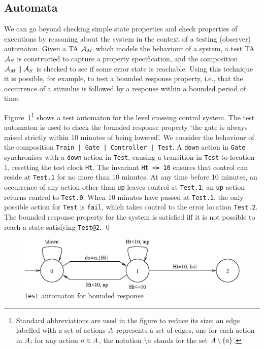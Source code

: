 {\subsection{Automata\label{ss:mscautomata}}
We can go beyond checking simple state properties and check properties
of executions by reasoning about the system in the context of a
testing (observer) automaton. Given a TA $\AA_M$ which models the
behaviour of a system, a test TA $\AA_S$ is constructed to capture a
property specification, and the composition $\AA_M
\parallel \AA_S$ is checked to see if some error state is 
reachable. Using this technique it is possible, for example, to test a
bounded response property, i.e., that the occurrence of a stimulus is
followed by a response within a bounded period of time.

\begin{exampleb}
Figure~\ref{fig:tgcresponse}\footnote{Standard abbreviations are used
in the figure to reduce its size: an edge labelled with a set of
actions $A$ represents a set of edges, one for each action in 
$A$; for any action $a \in A$, the notation ${}\setminus{a}$ 
stands for the set $A \setminus \{a\}$.} shows a test automaton for the
level crossing control system. The test automaton is used to check the
bounded response property `the gate is always raised strictly within
10 minutes of being lowered'. We consider the behaviour of the
composition {\tt Train | Gate | Controller | Test}. A {\tt down} action
in {\tt Gate} synchronises with a {\tt down} action in {\tt Test},
causing a transition in {\tt Test} to location 1, resetting the test
clock {\tt Ht}. The invariant {\tt Ht <= 10} ensures that control can
reside at {\tt Test.1} for no more than 10 minutes.  At any time
before 10 minutes, an occurrence of any action other than {\tt up}
leaves control at {\tt Test.1}; an {\tt up} action returns control to
{\tt Test.0}.  When 10 minutes have passed at {\tt Test.1}, the only
possible action for {\tt Test} is {\tt fail}, which takes control to
the error location {\tt Test.2}. The bounded response property for the
system is satisfied iff it is not possible to reach a state satisfying
{\tt Test@2}.
\qed
\end{exampleb}

\begin{figure}
\begin{center}
\includegraphics[width=.75\linewidth]{METHODS/tgcresponse.eps}
\end{center}
\caption{{\tt Test} automaton for bounded response\label{fig:tgcresponse}}
\end{figure}

}
